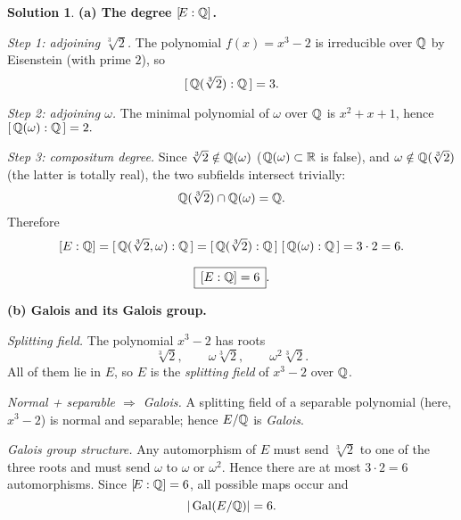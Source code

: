 \documentclass[12pt]{article}
\DeclareMathOperator{\Gal}{Gal}
\theoremstyle{definition} %
\newtheorem{solution}{Solution}
\theoremstyle{plain} %
\begin{document}
          \begin{solution}
          \bigskip
          \textbf{(a)  The degree \([\!E:\Bbb Q]\).}
          
          \smallskip
          \emph{Step 1: adjoining \(\sqrt[3]{2}\).}  
          The polynomial \(f(x)=x^{3}-2\) is irreducible over \(\Bbb Q\) by
          Eisenstein (with prime \(2\)), so
          \[
             [\,\Bbb Q(\sqrt[3]{2}):\Bbb Q\,]=3.
          \]
          
          \smallskip
          \emph{Step 2: adjoining \(\omega\).}  
          The minimal polynomial of \(\omega\) over \(\Bbb Q\) is
          \(x^{2}+x+1\), hence
          \(
             [\,\Bbb Q(\omega):\Bbb Q\,]=2.
          \)
          
          \smallskip
          \emph{Step 3: compositum degree.}  
          Since \(\sqrt[3]{2}\notin\Bbb Q(\omega)\)
          (\(\Bbb Q(\omega)\subset\Bbb R\) is false),
          and \(\omega\notin\Bbb Q(\sqrt[3]{2})\)
          (the latter is totally real),
          the two subfields intersect trivially:
          \[
             \Bbb Q(\sqrt[3]{2})\cap\Bbb Q(\omega)=\Bbb Q.
          \]
          Therefore
          \[
             [E:\Bbb Q]
                =[\,\Bbb Q(\sqrt[3]{2},\omega):\Bbb Q\,]
                =[\,\Bbb Q(\sqrt[3]{2}):\Bbb Q\,]\;
                 [\,\Bbb Q(\omega):\Bbb Q\,]
                =3\cdot2
                =6.
          \]
          
          \[
             \boxed{\, [E:\Bbb Q]=6 \,}.
          \]
          
          \bigskip
          \textbf{(b)  Galois and its Galois group.}
          
          \smallskip
          \emph{Splitting field.}  
          The polynomial \(x^{3}-2\) has roots
          \[
             \sqrt[3]{2},\qquad
             \omega\sqrt[3]{2},\qquad
             \omega^{2}\sqrt[3]{2}.
          \]
          All of them lie in \(E\), so \(E\) is the \emph{splitting field} of
          \(x^{3}-2\) over \(\Bbb Q\).
          
          \smallskip
          \emph{Normal + separable \(\Longrightarrow\) Galois.}  
          A splitting field of a separable polynomial (here, \(x^{3}-2\)) is
          normal and separable; hence \(E/\Bbb Q\) is \emph{Galois}.
          
          \smallskip
          \emph{Galois group structure.}  
          Any automorphism of \(E\) must send \(\sqrt[3]{2}\) to one of the three
          roots and must send \(\omega\) to \(\omega\) or \(\omega^{2}\).
          Hence there are at most \(3\cdot2=6\) automorphisms.
          Since \([\!E:\Bbb Q]=6\), all possible maps occur and
          \[
             |\Gal(E/\Bbb Q)|=6.
          \]
          

\end{solution}
\end{document}
